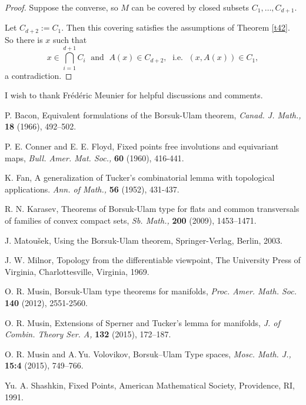 \documentclass[a4paper,12pt]{article}
\begin{document}
\begin{proof} Suppose the converse, so $M$ can be covered by closed subsets $C_1,\ldots,C_{d+1}$.
	
	Let $C_{d+2}:=C_1$. Then this covering satisfies the assumptions of Theorem \ref{t42}. So there is $x$ such that
	$$
	x\in \bigcap\limits_{i=1}^{d+1}{C_i} \; \mbox{ and } \; A(x)\in C_{d+2}, \; \mbox{ i.e. } \; (x,A(x)) \in C_1,
	$$
a contradiction. 	
\end{proof}

\medskip


\medskip

 I  wish to thank Fr\'ed\'eric Meunier  for helpful discussions and  comments.


\begin{thebibliography}{99}
	

P. Bacon, Equivalent formulations of the Borsuk-Ulam theorem, {\it Canad. J. Math.,}
{\bf 18} (1966), 492--502.

P. E. Conner and E. E. Floyd, Fixed points free involutions and equivariant maps, {\it Bull. Amer. Mat. Soc.,} {\bf 60} (1960), 416-441.


K. Fan, A generalization of Tucker's combinatorial lemma with topological applications. {\it Ann. of Math.,} {\bf 56} (1952), 431-437.



R. N. Karasev, Theorems of Borsuk-Ulam type for flats and common transversals of families of convex compact sets, {\it Sb. Math.,} {\bf 200} (2009), 1453--1471.

J. Matou\v{s}ek, Using the Borsuk-Ulam theorem, Springer-Verlag, Berlin, 2003.


J. W. Milnor, Topology from the differentiable viewpoint, The University Press of Virginia, Charlottesville, Virginia, 1969.

O. R. Musin, Borsuk-Ulam type theorems for manifolds,  {\it Proc. Amer. Math. Soc.}  {\bf 140} (2012), 2551-2560.

O. R. Musin, Extensions of Sperner and Tucker's lemma for manifolds, {\it J. of Combin. Theory Ser. A,} {\bf 132} (2015), 172--187.




O. R. Musin and A.\,Yu. Volovikov, Borsuk--Ulam Type spaces, {\it Mosc. Math. J.,}  {\bf 15:4} (2015), 749--766.


Yu. A. Shashkin, Fixed Points, American Mathematical Society, Providence, RI, 1991.



\end{thebibliography}
\end{document}
